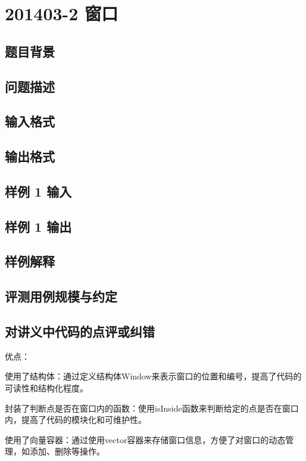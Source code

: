 \section{201403-2 窗口}

\subsection{题目背景}

\subsection{问题描述}

\subsection{输入格式}

\subsection{输出格式}

\subsection{样例 1 输入}

\subsection{样例 1 输出}

\subsection{样例解释}

\subsection{评测用例规模与约定}

\subsection{对讲义中代码的点评或纠错}
 
优点：

使用了结构体：通过定义结构体Window来表示窗口的位置和编号，提高了代码的可读性和结构化程度。

封装了判断点是否在窗口内的函数：使用isInside函数来判断给定的点是否在窗口内，提高了代码的模块化和可维护性。

使用了向量容器：通过使用vector容器来存储窗口信息，方便了对窗口的动态管理，如添加、删除等操作。

